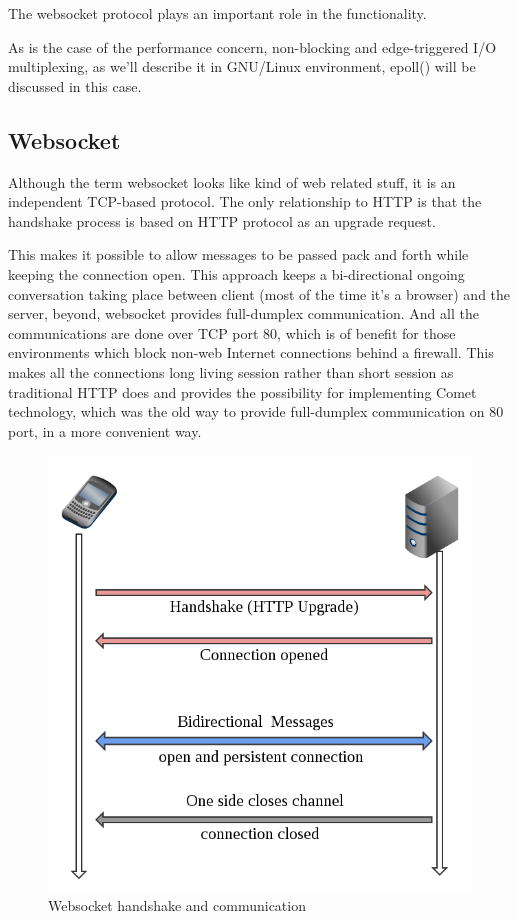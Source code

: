 \documentclass[preprint,numbers,numberedpars,10pt]{sigplanconf}
\begin{document}
The websocket protocol plays an important role in the functionality.

As is the case of the performance concern, non-blocking and edge-triggered I/O multiplexing, as we'll describe it in GNU/Linux environment, epoll()
will be discussed in this case.

\subsection{Websocket} \label{Websocket}

Although the term websocket looks like kind of web related stuff, it is an independent TCP-based protocol.
The only relationship to HTTP is that the handshake process is based on HTTP protocol as an upgrade request.

This makes it possible to allow messages to be passed pack and forth while keeping the connection open.
This approach keeps a bi-directional ongoing conversation taking place between client (most of the time it's a browser) and the server,
beyond, websocket provides full-dumplex communication.
And all the communications are done over TCP port 80, which is of benefit for those environments which block non-web Internet connections
behind a firewall. This makes all the connections long living session rather than short session as traditional HTTP does and provides the
possibility for implementing Comet technology, which was the old way to provide full-dumplex communication on 80 port, in a more convenient way.

\begin{figure}[tbph]
  \centering
  \label{fig:websocket_connection}
  \includegraphics[scale=0.3]{websocket.png}
  \caption{Websocket handshake and communication}
\end{figure}
\end{document}
